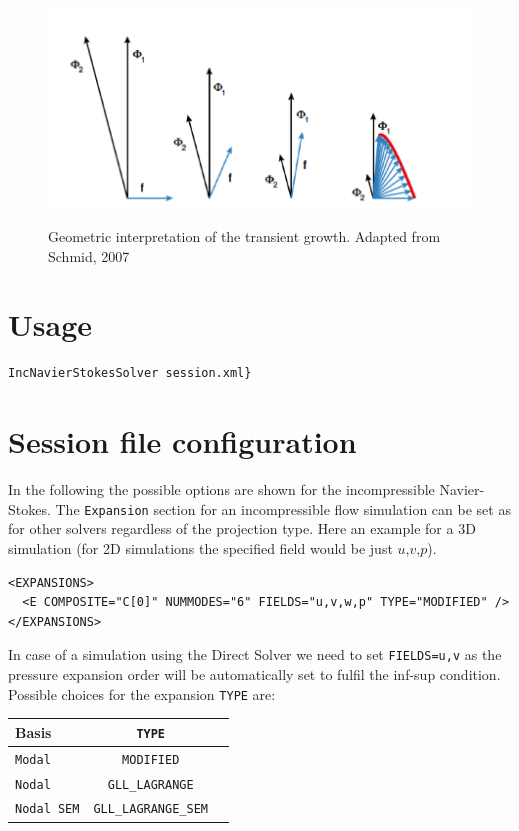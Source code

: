 \begin{figure}[!htbp]
\centering
 \label{TG}
 {\includegraphics[width=1 \textwidth]{Figures/transient_growth.png}}
   \caption {Geometric interpretation of the transient growth. Adapted from Schmid, 2007 }
\end{figure}


\section{Usage}

\begin{lstlisting}[style=BashInputStyle]
IncNavierStokesSolver session.xml}
\end{lstlisting}

\section{Session file configuration}

In the following the possible options are shown for the incompressible Navier-Stokes. The \texttt{Expansion} section for an incompressible flow simulation can be set as for other solvers regardless of the projection type. Here an example for a 3D simulation (for 2D simulations the specified field would be just $u$,$v$,$p$).

\begin{lstlisting}[style=XMLStyle]
<EXPANSIONS>
  <E COMPOSITE="C[0]" NUMMODES="6" FIELDS="u,v,w,p" TYPE="MODIFIED" />
</EXPANSIONS>
\end{lstlisting}

In case of a simulation using the Direct Solver we need to set \texttt{FIELDS=u,v} as the pressure expansion order will be automatically set to fulfil the inf-sup condition.
Possible choices for the expansion \texttt{TYPE} are:

\begin{table}
\begin{center}
\begin{tabular}{|l|c|c|} \hline
{Basis} & {\texttt{TYPE}} \\ \hline
\texttt{Modal} & \texttt{MODIFIED} \\ \hline
\texttt{Nodal} & \texttt{GLL\_LAGRANGE} \\ \hline
\texttt{Nodal SEM} & \texttt{GLL\_LAGRANGE\_SEM} \\ \hline
\end{tabular}
\end{center}
\end{table}

